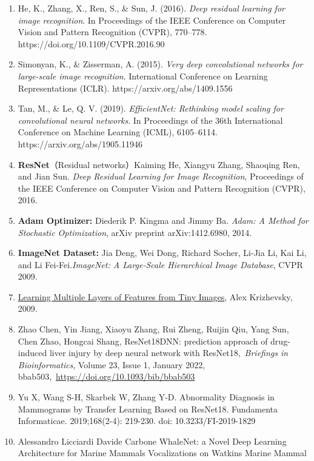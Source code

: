 \begin{enumerate}
\def\labelenumi{\arabic{enumi}.}
\tightlist
\item
  He, K., Zhang, X., Ren, S., \& Sun, J. (2016). \emph{Deep residual
  learning for image recognition}. In Proceedings of the IEEE Conference
  on Computer Vision and Pattern Recognition (CVPR), 770--778.
  https://doi.org/10.1109/CVPR.2016.90
\item
  Simonyan, K., \& Zisserman, A. (2015). \emph{Very deep convolutional
  networks for large-scale image recognition}. International Conference
  on Learning Representations (ICLR). https://arxiv.org/abs/1409.1556
\item
  Tan, M., \& Le, Q. V. (2019). \emph{EfficientNet: Rethinking model
  scaling for convolutional neural networks}. In Proceedings of the 36th
  International Conference on Machine Learning (ICML), 6105--6114.
  https://arxiv.org/abs/1905.11946
\item
  \textbf{ResNet}（Residual networks）Kaiming He, Xiangyu Zhang,
  Shaoqing Ren, and Jian Sun. \emph{Deep Residual Learning for Image
  Recognition}, Proceedings of the IEEE Conference on Computer Vision
  and Pattern Recognition (CVPR), 2016.
\item
  \textbf{Adam Optimizer:} Diederik P. Kingma and Jimmy Ba. \emph{Adam:
  A Method for Stochastic Optimization}, arXiv preprint arXiv:1412.6980,
  2014.
\item
  \textbf{ImageNet Dataset:} Jia Deng, Wei Dong, Richard Socher, Li-Jia
  Li, Kai Li, and Li Fei-Fei.\emph{ImageNet: A Large-Scale Hierarchical
  Image Database}, CVPR 2009.
\item
  \href{https://www.cs.toronto.edu/~kriz/learning-features-2009-TR.pdf}{Learning
  Multiple Layers of Features from Tiny Images}, Alex Krizhevsky, 2009.
\item
  Zhao Chen, Yin Jiang, Xiaoyu Zhang, Rui Zheng, Ruijin Qiu, Yang Sun,
  Chen Zhao, Hongcai Shang, ResNet18DNN: prediction approach of
  drug-induced liver injury by deep neural network with
  ResNet18,~\emph{Briefings in Bioinformatics}, Volume 23, Issue 1,
  January 2022, bbab503,~\url{https://doi.org/10.1093/bib/bbab503}
\item
  Yu X, Wang S-H, Skarbek W, Zhang Y-D. Abnormality Diagnosis in
  Mammograms by Transfer Learning Based on ResNet18. Fundamenta
  Informaticae. 2019;168(2-4): 219-230. doi: 10.3233/FI-2019-1829
\item
  Alessandro Licciardi Davide Carbone WhaleNet: a Novel Deep Learning
  Architecture for Marine Mammals Vocalizations on Watkins Marine Mammal

\end{enumerate}

